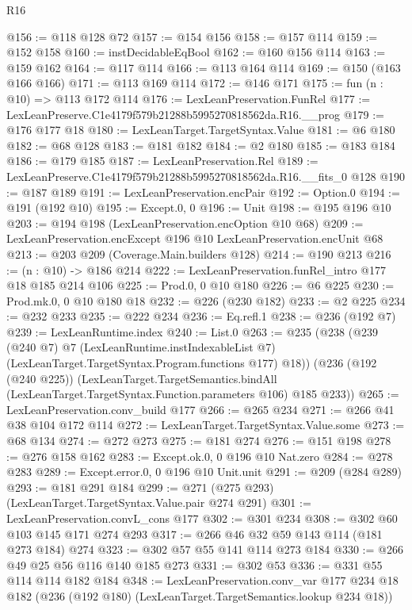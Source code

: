 \begin{lexlean}{R16}
\begin{coremodule}
@156 := @118 @128 @72
@157 := @154 @156
@158 := @157 @114
@159 := @152 @158
@160 := instDecidableEqBool
@162 := @160 @156 @114
@163 := @159 @162
@164 := @117 @114
@166 := @113 @164 @114
@169 := @150 (@163 @166 @166)
@171 := @113 @169 @114
@172 := @146 @171
@175 := fun (n : @10) => @113 @172 @114
@176 := LexLeanPreservation.FunRel
@177 := LexLeanPreserve.C1e4179f579b21288b5995270818562da.R16.__prog
@179 := @176 @177 @18
@180 := LexLeanTarget.TargetSyntax.Value
@181 := @6 @180
@182 := @68 @128
@183 := @181 @182
@184 := @2 @180
@185 := @183 @184
@186 := @179 @185
@187 := LexLeanPreservation.Rel
@189 := LexLeanPreserve.C1e4179f579b21288b5995270818562da.R16.__fits_0 @128
@190 := @187 @189
@191 := LexLeanPreservation.encPair
@192 := Option.{0}
@194 := @191 (@192 @10)
@195 := Except.{0, 0}
@196 := Unit
@198 := @195 @196 @10
@203 := @194 @198 (LexLeanPreservation.encOption @10 @68)
@209 := LexLeanPreservation.encExcept @196 @10 LexLeanPreservation.encUnit @68
@213 := @203 @209 (Coverage.Main.builders @128)
@214 := @190 @213
@216 := (n : @10) -> @186 @214
@222 := LexLeanPreservation.funRel_intro @177 @18 @185 @214 @106
@225 := Prod.{0, 0} @10 @180
@226 := @6 @225
@230 := Prod.mk.{0, 0} @10 @180 @18
@232 := @226 (@230 @182)
@233 := @2 @225
@234 := @232 @233
@235 := @222 @234
@236 := Eq.refl.{1}
@238 := @236 (@192 @7)
@239 := LexLeanRuntime.index
@240 := List.{0}
@263 := @235
    (@238
      (@239
        (@240 @7)
        @7
        (LexLeanRuntime.instIndexableList @7)
        (LexLeanTarget.TargetSyntax.Program.functions @177)
        @18))
    (@236
      (@192 (@240 @225))
      (LexLeanTarget.TargetSemantics.bindAll
        (LexLeanTarget.TargetSyntax.Function.parameters @106)
        @185
        @233))
@265 := LexLeanPreservation.conv_build @177
@266 := @265 @234
@271 := @266 @41 @38 @104 @172 @114
@272 := LexLeanTarget.TargetSyntax.Value.some
@273 := @68 @134
@274 := @272 @273
@275 := @181 @274
@276 := @151 @198
@278 := @276 @158 @162
@283 := Except.ok.{0, 0} @196 @10 Nat.zero
@284 := @278 @283
@289 := Except.error.{0, 0} @196 @10 Unit.unit
@291 := @209 (@284 @289)
@293 := @181 @291 @184
@299 := @271 (@275 @293) (LexLeanTarget.TargetSyntax.Value.pair @274 @291)
@301 := LexLeanPreservation.convL_cons @177
@302 := @301 @234
@308 := @302 @60 @103 @145 @171 @274 @293
@317 := @266 @46 @32 @59 @143 @114 (@181 @273 @184) @274
@323 := @302 @57 @55 @141 @114 @273 @184
@330 := @266 @49 @25 @56 @116 @140 @185 @273
@331 := @302 @53
@336 := @331 @55 @114 @114 @182 @184
@348 := LexLeanPreservation.conv_var
    @177
    @234
    @18
    @182
    (@236 (@192 @180) (LexLeanTarget.TargetSemantics.lookup @234 @18))

\end{coremodule}
\end{lexlean}
